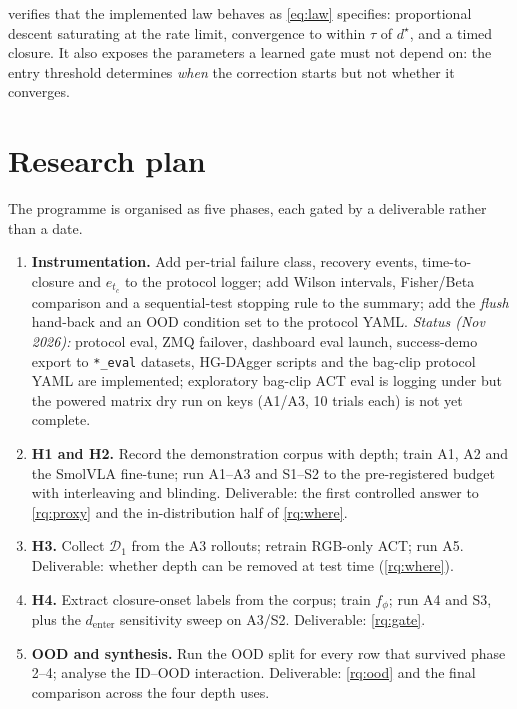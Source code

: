 \documentclass[11pt,a4paper]{article}
\theoremstyle{definition}
\begin{document}
 verifies that the implemented law behaves as \cref{eq:law} specifies: proportional descent saturating at the rate limit, convergence to within $\tau$ of $d^\star$, and a timed closure. It also exposes the parameters a learned gate must not depend on: the entry threshold determines \emph{when} the correction starts but not whether it converges.

\section{Research plan}
\label{sec:plan}

The programme is organised as five phases, each gated by a deliverable rather than a date.

\begin{enumerate}[leftmargin=*,itemsep=3pt]
\item \textbf{Instrumentation.} Add per-trial failure class, recovery events, time-to-closure and $e_{t_c}$ to the protocol logger; add Wilson intervals, Fisher/Beta comparison and a sequential-test stopping rule to the summary; add the \emph{flush} hand-back and an OOD condition set to the protocol YAML. \emph{Status (Nov 2026):} protocol eval, ZMQ failover, dashboard eval launch, success-demo export to \texttt{*\_eval} datasets, HG-DAgger scripts and the bag-clip protocol YAML are implemented; exploratory bag-clip ACT eval is logging under  but the powered matrix dry run on keys (A1/A3, 10 trials each) is not yet complete.
\item \textbf{H1 and H2.} Record the demonstration corpus with depth; train A1, A2 and the SmolVLA fine-tune; run A1--A3 and S1--S2 to the pre-registered budget with interleaving and blinding. Deliverable: the first controlled answer to \cref{rq:proxy} and the in-distribution half of \cref{rq:where}.
\item \textbf{H3.} Collect $\mathcal{D}_1$ from the A3 rollouts; retrain RGB-only ACT; run A5. Deliverable: whether depth can be removed at test time (\cref{rq:where}).
\item \textbf{H4.} Extract closure-onset labels from the corpus; train $f_\phi$; run A4 and S3, plus the $d_{\mathrm{enter}}$ sensitivity sweep on A3/S2. Deliverable: \cref{rq:gate}.
\item \textbf{OOD and synthesis.} Run the OOD split for every row that survived phase 2--4; analyse the ID--OOD interaction. Deliverable: \cref{rq:ood} and the final comparison across the four depth uses.
\end{enumerate}
\end{document}
